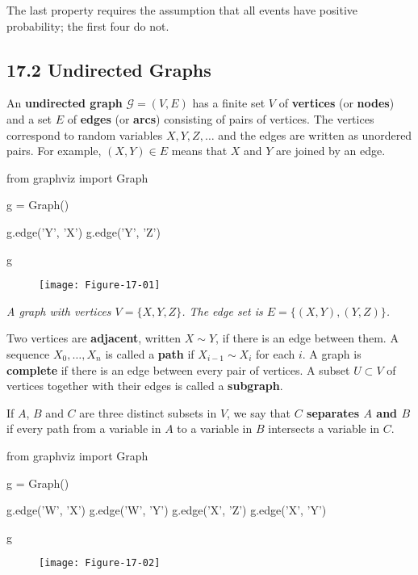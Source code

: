 The last property requires the assumption that all events have positive
probability; the first four do not.

\subsection*{17.2 Undirected Graphs}\label{undirected-graphs}

An \textbf{undirected graph} \(\mathcal{G} = (V, E)\) has a finite set
\(V\) of \textbf{vertices} (or \textbf{nodes}) and a set \(E\) of
\textbf{edges} (or \textbf{arcs}) consisting of pairs of vertices. The
vertices correspond to random variables \(X, Y, Z, \dots\) and the edges
are written as unordered pairs. For example, \((X, Y) \in E\) means that
\(X\) and \(Y\) are joined by an edge.

\begin{python}
from graphviz import Graph

g = Graph()

g.edge('Y', 'X')
g.edge('Y', 'Z')

g
\end{python}

\begin{figure}[H]
\centering
\texttt{[image: Figure-17-01]}
\end{figure}

\emph{A graph with vertices \(V = \{X, Y, Z\}\). The edge set is
\(E = \{(X, Y), (Y, Z)\}\).}

Two vertices are \textbf{adjacent}, written \(X \sim Y\), if there is an
edge between them. A sequence \(X_{0}, \dots, X_{n}\) is called a
\textbf{path} if \(X_{i-1} \sim X_{i}\) for each \(i\). A graph is
\textbf{complete} if there is an edge between every pair of vertices. A
subset \(U \subset V\) of vertices together with their edges is called a
\textbf{subgraph}.

If \(A\), \(B\) and \(C\) are three distinct subsets in \(V\), we say
that \textbf{\(C\) separates \(A\) and \(B\)} if every path from a
variable in \(A\) to a variable in \(B\) intersects a variable in \(C\).

\begin{python}
from graphviz import Graph

g = Graph()

g.edge('W', 'X')
g.edge('W', 'Y')
g.edge('X', 'Z')
g.edge('X', 'Y')

g
\end{python}

\begin{figure}[H]
\centering
\texttt{[image: Figure-17-02]}
\end{figure}

